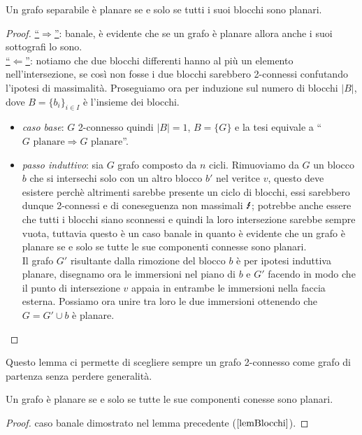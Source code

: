 \begin{lemma}\label{lemBlocchi}
    Un grafo separabile è planare se e solo se tutti i suoi blocchi sono planari.
    \begin{proof}
        \underline{“\(\Rightarrow\)”}: banale, è evidente che se un grafo è planare allora anche i suoi sottografi lo sono.\\
        \underline{“\(\Leftarrow\)”}: notiamo che due blocchi differenti hanno al più un elemento nell'intersezione, se così non fosse i due blocchi sarebbero 2-connessi confutando l'ipotesi di massimalità. Proseguiamo ora per induzione sul numero di blocchi \(|B|\), dove \(B={\{b_i\}}_{i \in I}\) è l'insieme dei blocchi.
        \begin{itemize}
            \item \textit{caso base}: \(G\) 2-connesso quindi \(|B|=1\), \(B=\{G\}\) e la tesi equivale a “\(G \text{ planare} \Rightarrow G \text{ planare}\)”.
            \item \textit{passo induttivo}: sia \(G\) grafo composto da \(n\) cicli. Rimuoviamo da \(G\) un blocco \(b\) che si intersechi solo con un altro blocco \(b'\) nel veritce \(v\), questo deve esistere perchè altrimenti sarebbe presente un ciclo di blocchi, essi sarebbero dunque 2-connessi e di coneseguenza non massimali \(\text{\Lightning}\); 
            potrebbe anche essere che tutti i blocchi siano sconnessi e quindi la loro intersezione sarebbe sempre vuota, tuttavia questo è un caso banale in quanto è evidente che un grafo è planare se e solo se tutte le sue componenti connesse sono planari. 
            \\ Il grafo \(G'\) risultante dalla rimozione del blocco \(b\) è per ipotesi induttiva planare, disegnamo ora le immersioni nel piano di \(b\) e \(G'\) facendo in modo che il punto di intersezione \(v\) appaia in entrambe le immersioni nella faccia esterna. Possiamo ora unire tra loro le due immersioni ottenendo che \(G=G' \cup b\) è planare.
        \end{itemize}
    \end{proof}
\end{lemma}
\noindent Questo lemma ci permette di scegliere sempre un grafo 2-connesso come grafo di partenza senza perdere generalità.

\begin{lemma}
    Un grafo è planare se e solo se tutte le sue componenti conesse sono planari.
    \begin{proof}
        caso banale dimostrato nel lemma precedente (\(\ref{lemBlocchi}\)).
    \end{proof}
\end{lemma}

